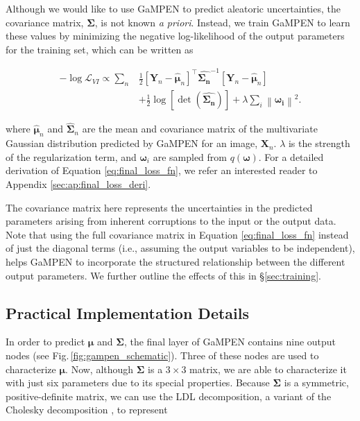\documentclass[twocolumn]{aastex63}
\newcommand\gampen{GaMPEN}
\begin{document}
\begin{CJK*}{UTF8}{gbsn}
Although we would like to use \gampen{} to predict aleatoric uncertainties, the covariance matrix, $\boldsymbol{\Sigma}$, is not known {\it a priori}. Instead, we train \gampen{} to learn these values by minimizing the negative log-likelihood of the output parameters for the training set, which can be written as

\begin{equation}
\begin{split}
- \log \mathcal{L}_{VI} \propto  \sum_{n} & \frac{1}{2}\left[\boldsymbol{Y}_{n}-\boldsymbol{\hat{\mu}}_{n}\right]^{\top} \boldsymbol{\hat{\Sigma_n}}^{-1}\left[\boldsymbol{Y}_{n}-\boldsymbol{\hat{\mu}}_{n}\right] \\ 
& + \frac{1}{2} \log [\operatorname{det}(\boldsymbol{\hat{\Sigma_n}})] + \lambda \sum_{i}\left\|\boldsymbol{\omega_{i}}\right\|^{2} .
\end{split}
\label{eq:final_loss_fn}
\end{equation}

where $\boldsymbol{\hat{\mu}}_n$ and $\boldsymbol{\hat{\Sigma}}_n$ are the mean and covariance matrix of the multivariate Gaussian distribution predicted by \gampen{} for an image, $\boldsymbol{X}_n$. $\lambda$ is the strength of the regularization term, and $\boldsymbol{\omega}_i$ are sampled from $q(\boldsymbol{\omega})$. For a detailed derivation of Equation \ref{eq:final_loss_fn}, we refer an interested reader to Appendix \ref{sec:ap:final_loss_deri}.

The covariance matrix here represents the uncertainties in the predicted parameters arising from inherent corruptions to the input or the output data. Note that using the full covariance matrix in Equation \ref{eq:final_loss_fn} instead of just the diagonal terms (i.e., assuming the output variables to be independent), helps \gampen{} to incorporate the structured relationship between the different output parameters. We further outline the effects of this in \S \ref{sec:training}.


\subsection{Practical Implementation Details} \label{subsec:uncertainty_implementation}

In order to predict $\boldsymbol{\mu}$ and $\boldsymbol{\Sigma}$, the final layer of \gampen{} contains nine output nodes (see Fig.\,\ref{fig:gampen_schematic}). Three of these nodes are used to characterize $\boldsymbol{\mu}$. %
Now, although $\boldsymbol{\Sigma}$ is a $3\times3$ matrix, we are able to characterize it with just six parameters due to its special properties. Because $\boldsymbol{\Sigma}$ is a symmetric, positive-definite matrix, we can use the LDL decomposition, a variant of the Cholesky decomposition \citep{cholesky}, to represent 


\end{CJK*}
\end{document}
